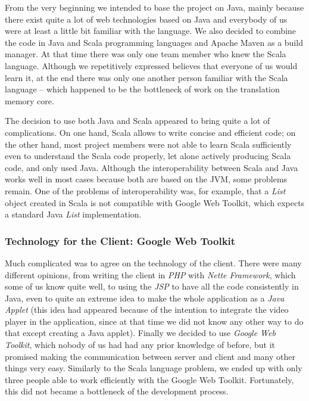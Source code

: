 From the very beginning we intended to base the project on Java, mainly because there exist quite a lot of web technologies based on Java and everybody of us were at least a little bit familiar with the language. We also decided to combine the code in Java and Scala programming languages and Apache Maven as a build manager. At that time there was only one team member who knew the Scala language. Although we repetitively expressed believes that everyone of us would learn it, at the end there was only one another person familiar with the Scala language -- which happened to be the bottleneck of work on the translation memory core.
	
The decision to use both Java and Scala appeared to bring quite a lot of complications. On one hand, Scala allows to write concise and efficient code; on the other hand, most project members were not able to learn Scala sufficiently even to understand the Scala code properly, let alone actively producing Scala code, and only used Java.
Although the interoperability between Scala and Java works well in most cases because both are based on the JVM, some problems remain. One of the problems of interoperability was, for example, that a \emph{List} object created in Scala is not compatible with Google Web Toolkit, which expects a standard Java \emph{List} implementation.

\subsubsection{Technology for the Client: Google Web Toolkit}
\label{subsubsec:implementation:gwt}

Much complicated was to agree on the technology of the client. There were many different opinions, from writing the client in {\it PHP} with {\it Nette Framework}, which some of us know quite well, to using the {\it JSP} to have all the code consistently in Java, even to quite an extreme idea to make the whole application as a {\it Java Applet} (this idea had appeared because of the intention to integrate the video player in the application, since at that time we did not know any other way to do that except creating a Java applet). Finally we decided to use {\it Google Web Toolkit}, which nobody of us had had any prior knowledge of before, but it promised making the communication between server and client and many other things very easy. Similarly to the Scala language problem, we ended up with only three people able to work efficiently with the Google Web Toolkit. Fortunately, this did not became a bottleneck of the development process.

